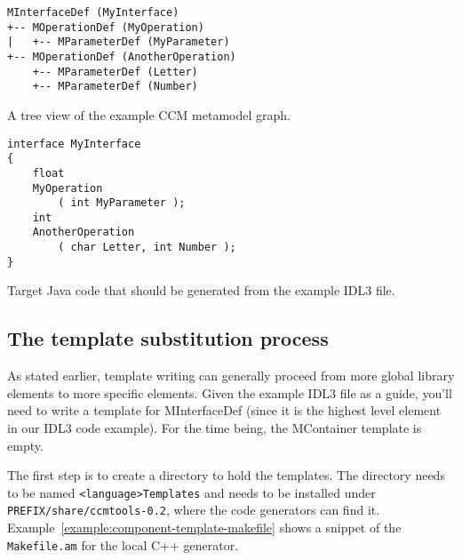\begin{Example}
\begin{minifbox}
\begin{small}
\begin{verbatim}
MInterfaceDef (MyInterface)
+-- MOperationDef (MyOperation)
|   +-- MParameterDef (MyParameter)
+-- MOperationDef (AnotherOperation)
    +-- MParameterDef (Letter)
    +-- MParameterDef (Number)
\end{verbatim}
\end{small}
\end{minifbox}
\caption{A tree view of the example CCM metamodel graph.}
\label{example:component-parse-tree}
\end{Example}

\begin{Example}
\begin{minifbox}
\begin{small}
\begin{verbatim}
interface MyInterface
{
    float
    MyOperation
        ( int MyParameter );
    int
    AnotherOperation
        ( char Letter, int Number );
}
\end{verbatim}
\end{small}
\end{minifbox}
\caption{Target Java code that should be generated from the example IDL3 file.}
\label{example:component-generated-java}
\end{Example}

\subsection{The template substitution process}

As stated earlier, template writing can generally proceed from more global
library elements to more specific elements. Given the example IDL3 file as a
guide, you'll need to write a template for MInterfaceDef (since it is the
highest level element in our IDL3 code example). For the time being, the
MContainer template is empty.

The first step is to create a directory to hold the templates. The directory
needs to be named {\tt <language>Templates} and needs to be installed under {\tt
PREFIX/share/ccmtools-0.2}, where the code generators can find it.
Example~\ref{example:component-template-makefile} shows a snippet of the {\tt
Makefile.am} for the local C++ generator.

